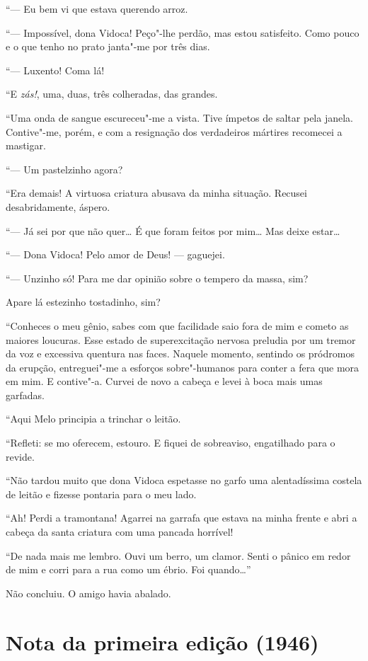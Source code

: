 ``--- Eu bem vi que estava querendo arroz.

``--- Impossível, dona Vidoca! Peço"-lhe perdão, mas estou satisfeito.
Como pouco e o que tenho no prato janta"-me por três dias.

``--- Luxento! Coma lá!

``E \emph{zás!}, uma, duas, três colheradas, das grandes.

``Uma onda de sangue escureceu"-me a vista. Tive ímpetos de saltar pela
janela. Contive"-me, porém, e com a resignação dos verdadeiros mártires
recomecei a mastigar.

``--- Um pastelzinho agora?

``Era demais! A virtuosa criatura abusava da minha situação. Recusei
desabridamente, áspero.

``--- Já sei por que não quer\ldots{} É que foram feitos por mim\ldots{} Mas deixe
estar\ldots{}

``--- Dona Vidoca! Pelo amor de Deus! --- gaguejei.

``--- Unzinho só! Para me dar opinião sobre o tempero da massa, sim?

Apare lá estezinho tostadinho, sim?

``Conheces o meu gênio, sabes com que facilidade saio fora de mim e
cometo as maiores loucuras. Esse estado de superexcitação nervosa
preludia por um tremor da voz e excessiva quentura nas faces. Naquele
momento, sentindo os pródromos da erupção, entreguei"-me a esforços
sobre"-humanos para conter a fera que mora em mim. E contive"-a. Curvei de
novo a cabeça e levei à boca mais umas garfadas.

``Aqui Melo principia a trinchar o leitão.

``Refleti: se mo oferecem, estouro. E fiquei de sobreaviso, engatilhado
para o revide.

``Não tardou muito que dona Vidoca espetasse no garfo uma alentadíssima
costela de leitão e fizesse pontaria para o meu lado.

``Ah! Perdi a tramontana! Agarrei na garrafa que estava na minha frente
e abri a cabeça da santa criatura com uma pancada horrível!

``De nada mais me lembro. Ouvi um berro, um clamor. Senti o pânico em
redor de mim e corri para a rua como um ébrio. Foi quando\ldots{}''

Não concluiu. O amigo havia abalado.

\section*{Nota da primeira edição (1946)}

